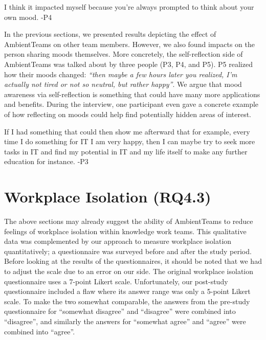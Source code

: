 \begin{displayquote}
    I think it impacted myself because you're always prompted to think about your own mood. -P4
\end{displayquote}

In the previous sections, we presented results depicting the effect of AmbientTeams on other team members. However, we also found impacts on the person sharing moods themselves. More concretely, the self-reflection side of AmbientTeams was talked about by three people (P3, P4, and P5). P5 realized how their moods changed: \textit{\enquote{then maybe a few hours later you realized, I'm actually not tired or not so neutral, but rather happy}}. We argue that mood awareness via self-reflection is something that could have many more applications and benefits. During the interview, one participant even gave a concrete example of how reflecting on moods could help find potentially hidden areas of interest.

\begin{displayquote}
    If I had something that could then show me afterward that for example, every time I do something for IT I am very happy, then I can maybe try to seek more tasks in IT and find my potential in IT and my life itself to make any further education for instance. -P3
\end{displayquote}

\section{Workplace Isolation (RQ4.3)}
\label{section:workplace_isolation}

The above sections may already suggest the ability of AmbientTeams to reduce feelings of workplace isolation within knowledge work teams. This qualitative data was complemented by our approach to measure workplace isolation quantitatively; a questionnaire was surveyed before and after the study period. Before looking at the results of the questionnaires, it should be noted that we had to adjust the scale due to an error on our side. The original workplace isolation questionnaire uses a 7-point Likert scale. Unfortunately, our post-study questionnaire included a flaw where its answer range was only a 5-point Likert scale. To make the two somewhat comparable, the answers from the pre-study questionnaire for \enquote{somewhat disagree} and \enquote{disagree} were combined into \enquote{disagree}, and similarly the answers for \enquote{somewhat agree} and \enquote{agree} were combined into \enquote{agree}.

